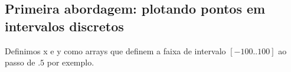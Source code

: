 \documentclass{article}
\begin{document}
\begin{figure}[!h]
	\begin{floatrow}

	\end{floatrow}
\end{figure}

\newpage
\subsection*{Primeira abordagem: plotando pontos em intervalos discretos}

Definimos x e y como arrays que definem a faixa de intervalo
$[-100..100]$ ao passo de $.5$ por exemplo.


\end{document}
